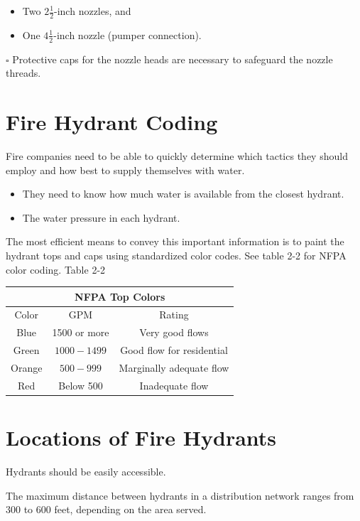 \documentclass[10pt]{article}
\begin{document}
\begin{itemize}
  \item Two $2 \frac{1}{2}$-inch nozzles, and

  \item One $4 \frac{1}{2}$-inch nozzle (pumper connection).

\end{itemize}
$\square$ Protective caps for the nozzle heads are necessary to safeguard the nozzle threads.

\section{Fire Hydrant Coding}
Fire companies need to be able to quickly determine which tactics they should employ and how best to supply themselves with water.

\begin{itemize}
  \item They need to know how much water is available from the closest hydrant.

  \item The water pressure in each hydrant.

\end{itemize}
The most efficient means to convey this important information is to paint the hydrant tops and caps using standardized color codes. See table 2-2 for NFPA color coding. Table 2-2

\begin{tabular}{|c|c|c|}
\hline
\multicolumn{3}{|c|}{NFPA Top Colors} \\
\hline
Color & GPM & Rating \\
\hline
Blue & 1500 or more & Very good flows \\
\hline
Green & $1000-1499$ & Good flow for residential \\
\hline
Orange & $500-999$ & Marginally adequate flow \\
\hline
Red & Below 500 & Inadequate flow \\
\hline
\end{tabular}

\section{Locations of Fire Hydrants}
Hydrants should be easily accessible.

The maximum distance between hydrants in a distribution network ranges from 300 to 600 feet, depending on the area served.
\end{document}
